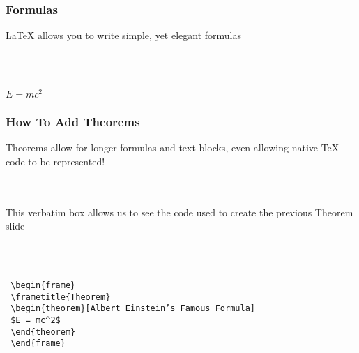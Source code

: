 \documentclass{beamer}
\begin{document}

\begin{frame}
\frametitle{Formulas}

LaTeX allows you to write simple, yet elegant formulas

\\~\\

\begin{theorem}
$E = mc^2$
\end{theorem}
\end{frame}


\begin{frame}[fragile]
\frametitle{How To Add Theorems}

Theorems allow for longer formulas and text blocks, even allowing native TeX code to be represented!

\\~\\

This verbatim box allows us to see the code used to create the previous Theorem slide

\\~\\

\begin{example}
\begin{verbatim}
 \begin{frame}
 \frametitle{Theorem}
 \begin{theorem}[Albert Einstein’s Famous Formula]
 $E = mc^2$
 \end{theorem}
 \end{frame}\end{verbatim}
\end{example}
\end{frame}

\end{document}
